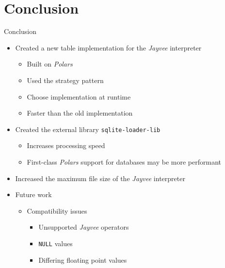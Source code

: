 \section{Conclusion}
\begin{frame}[t]{Conclusion}
	\begin{itemize}
		\item Created a new table implementation for the \emph{Jayvee} interpreter
		      \begin{itemize}
			      \item Built on \emph{Polars}
			      \item Used the strategy pattern
			      \item Choose implementation at runtime
			      \item Faster than the old implementation
		      \end{itemize}
		\item Created the external library \Verb|sqlite-loader-lib|
		      \begin{itemize}
			      \item Increases processing speed
			      \item First-class \emph{Polars} support for databases may be more performant
		      \end{itemize}
		\item Increased the maximum file size of the \emph{Jayvee} interpreter
		\item Future work
		      \begin{itemize}
			      \item Compatibility issues
			            \begin{itemize}
				            \item Unsupported \emph{Jayvee} operators
				            \item \Verb|NULL| values
				            \item Differing floating point values
			            \end{itemize}
		      \end{itemize}
	\end{itemize}
\end{frame}
